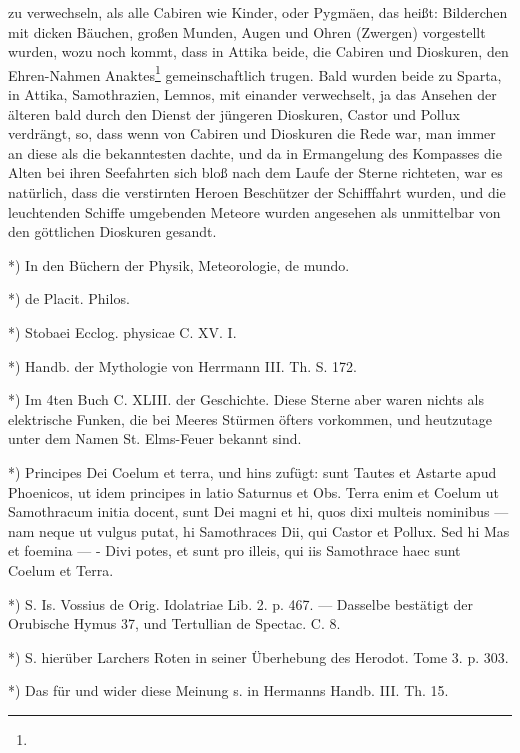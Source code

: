 \documentclass[a4paper, 11pt, oneside, polutonikogreek, german]{article}
\begin{document}
zu verwechseln, als alle Cabiren wie Kinder, oder Pygmäen, das heißt: Bilderchen mit dicken Bäuchen, großen Munden, Augen und Ohren (Zwergen) vorgestellt wurden, wozu noch kommt, dass in Attika beide, die Cabiren und Dioskuren, den Ehren-Nahmen Anaktes\footnote{} gemeinschaftlich trugen. Bald wurden beide zu Sparta, in Attika, Samothrazien, Lemnos, mit einander verwechselt, ja das Ansehen der älteren bald durch den Dienst der jüngeren Dioskuren, Castor und Pollux verdrängt, so, dass wenn von Cabiren und Dioskuren die Rede war, man immer an diese als die bekanntesten dachte, und da in Ermangelung des Kompasses die Alten bei ihren Seefahrten sich bloß nach dem Laufe der Sterne richteten, war es natürlich, dass die verstirnten Heroen Beschützer der Schifffahrt wurden, und die leuchtenden Schiffe umgebenden Meteore wurden angesehen als unmittelbar von den göttlichen Dioskuren gesandt.

*) In den Büchern der Physik, Meteorologie, de mundo.

*) de Placit. Philos.

*) Stobaei Ecclog. physicae C. XV. I.

*) Handb. der Mythologie von Herrmann III. Th. S. 172.

*) Im 4ten Buch C. XLIII. der Geschichte. Diese Sterne aber waren nichts als elektrische Funken, die bei Meeres Stürmen öfters vorkommen, und heutzutage unter dem Namen St. Elms-Feuer bekannt sind.

*) Principes Dei Coelum et terra, und hins zufügt: sunt Tautes et Astarte apud Phoenicos, ut idem principes in latio Saturnus et Obs. Terra enim et Coelum ut Samothracum initia docent, sunt Dei magni et hi, quos dixi multeis nominibus --- nam neque ut vulgus putat, hi Samothraces Dii, qui Castor et Pollux. Sed hi Mas et foemina --- - Divi potes, et sunt pro illeis, qui iis Samothrace haec sunt Coelum et Terra.

*) S. Is. Vossius de Orig. Idolatriae Lib. 2. p. 467. --- Dasselbe bestätigt der Orubische Hymus 37, und Tertullian de Spectac. C. 8.

*) S. hierüber Larchers Roten in seiner Überhebung des Herodot. Tome 3. p. 303.

*) Das für und wider diese Meinung s. in Hermanns Handb. III. Th. 15.
\end{document}
